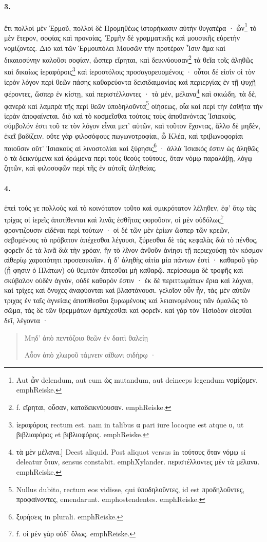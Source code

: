\documentclass[a4paper, 11pt, oneside, polutonikogreek, german]{article}
\begin{document}
\paragraph{3.}
ἔτι πολλοὶ μὲν Ἑρμοῦ, πολλοὶ δὲ Προμηθέως ἱστορήκασιν αὐτὴν θυγατέρα · ὧν\footnote{Aut ὧν delendum, aut cum ὡς mutandum, aut deinceps legendum νομίζομεν. emph{Reiske.}} τὸ μὲν ἕτερον, σοφίας καὶ προνοίας, Ἑρμῆν δὲ γραμματικῆς καὶ μουσικῆς εὑρετὴν νομίζοντες. Διὸ καὶ τῶν Ἑρμουπόλει Μουσῶν τὴν προτέραν Ἶσιν ἅμα καὶ δικαιοσύνην καλοῦσι σοφίαν, ὥσπερ εἴρηται, καὶ δεικνύουσαν\footnote{f. εἴρηται, οὖσαν, καταδεικνύουσαν. emph{Reiske.}} τὰ θεῖα τοῖς ἀληθῶς καὶ δικαίως ἱεραφόροις\footnote{ἱεραφόροις rectum est. nam in talibus α pari iure locoque est atque ο, ut βιβλιαφόρος et βιβλιοφόρος. emph{Reiske.}} καὶ ἱεροστόλοις προσαγορευομένοις · οὗτοι δέ εἰσὶν οἱ τὸν ἱερὸν λόγον περὶ θεῶν πάσης καθαρεύοντα δεισιδαιμονίας καὶ περιεργίας ἐν τῇ ψυχῇ φέροντες, ὥσπερ ἐν κίστῃ, καὶ περιστέλλοντες · τὰ μὲν, μέλανα\footnote{τὰ μὲν μέλανα.] Deest aliquid. Post aliquot versus in τούτους ὅταν νόμῳ si deleatur ὅταν, sensus constabit. emph{Xylander.} περιστέλλοντες μὲν τὰ μέλανα. emph{Reiske.}} καὶ σκιώδη, τὰ δὲ, φανερὰ καὶ λαμπρὰ τῆς περὶ θεῶν ὑποδηλοῦντα\footnote{Nullus dubito, rectum eos vidisse, qui ὑποδηλοῦντες, id est προδηλοῦντες, προφαίνοντες, emendarunt. emph{ostendentes.} emph{Reiske.}} οἰήσεως, οἷα καὶ περὶ τὴν ἐσθῆτα τὴν ἱερὰν ἀποφαίνεται. διὸ καὶ τὸ κοσμεῖσθαι τούτοις τοὺς ἀποθανόντας Ἰσιακοὺς, σύμβολόν ἐστι τοῦ τε τὸν λόγον εἶναι μετ' αὐτῶν, καὶ τοῦτον ἔχοντας, ἄλλο δὲ μηδὲν, ἐκεῖ βαδίζειν. οὔτε γὰρ φιλοσόφους πωγωνοτροφίαι, ὦ Κλέα, καὶ τριβωνοφορίαι ποιοῦσιν οὔτ' Ἰσιακοὺς αἱ λινοστολίαι καὶ ξύρησις\footnote{ξυρήσεις in plurali. emph{Reiske.}} · ἀλλὰ Ἰσιακός ἐστιν ὡς ἀληθῶς ὁ τὰ δεικνύμενα καὶ δρώμενα περὶ τοὺς θεοὺς τούτους, ὅταν νόμῳ παραλάβῃ, λόγῳ ζητῶν, καὶ φιλοσοφῶν περὶ τῆς ἐν αὐτοῖς ἀληθείας.

\paragraph{4.}
ἐπεὶ τούς γε πολλοὺς καὶ τὸ κοινότατον τοῦτο καὶ σμικρότατον λέληθεν, ἐφ' ὅτῳ τὰς τρίχας οἱ ἱερεῖς ἀποτίθενται καὶ λινᾶς ἐσθῆτας φοροῦσιν, οἱ μὲν οὐδόλως\footnote{f. οἱ μὲν γὰρ οὐδ' ὅλως. emph{Reiske.}} φροντιζουσιν εἰδέναι περὶ τούτων · οἱ δὲ τῶν μὲν ἐρίων ὥσπερ τῶν κρεῶν, σεβομένους τὸ πρόβατον ἀπέχεσθαι λέγουσι, ξύρεσθαι δὲ τὰς κεφαλὰς διὰ τὸ πένθος, φορεῖν δὲ τὰ λινᾶ διὰ τὴν χρόαν, ἣν τὸ λῖνον ἀνθοῦν ἀνίησι τῇ περιεχούσῃ τὸν κόσμον αἰθερίῳ χαροπότητι προσεοικυῖαν. ἡ δ' ἀληθὴς αἰτία μία πάντων ἐστί · καθαροῦ γὰρ (ᾗ φησιν ὁ Πλάτων) οὐ θεμιτὸν ἅπτεσθαι μὴ καθαρῷ. περίσσωμα δὲ τροφῆς καὶ σκύβαλον οὐδὲν ἁγνὸν, οὐδὲ καθαρόν ἐστιν · ἐκ δὲ περιττωμάτων ἔρια καὶ λάχναι, καὶ τρίχες καὶ ὄνυχες ἀναφύονται καὶ βλαστάνουσι. γελοῖον οὖν ἦν, τὰς μὲν αὐτῶν τριχας ἐν ταῖς ἁγνείαις ἀποτίθεσθαι ξυρωμένους καὶ λειαινομένους πᾶν ὁμαλῶς τὸ σῶμα, τὰς δὲ τῶν θρεμμάτων ἀμπέχεσθαι καὶ φορεῖν. καὶ γὰρ τὸν Ἡσίοδον οἴεσθαι δεῖ, λέγοντα ·
\begin{quotation}
Μηδ' ἀπὸ πεντόζοιο θεῶν ἐν δαιτὶ θαλείῃ

Αὖον ἀπὸ χλωροῦ τάμνειν αἴθωνι σιδήρῳ ·
\end{quotation}
\end{document}
